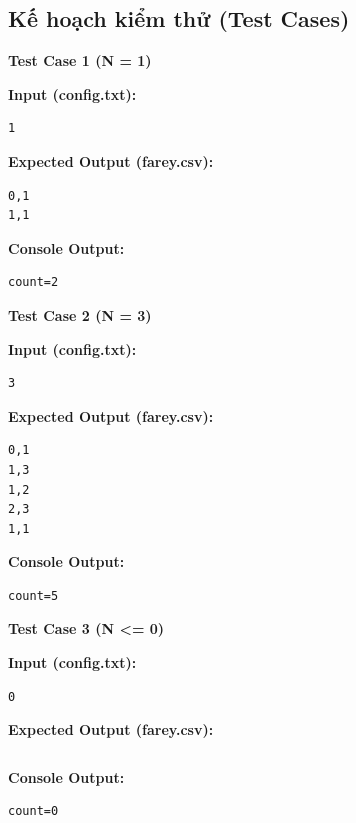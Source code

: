 \subsection{Kế hoạch kiểm thử (Test Cases)}

\textbf{Test Case 1 (N = 1)}

\textbf{Input (config.txt):}
\begin{lstlisting}
1
\end{lstlisting}

\textbf{Expected Output (farey.csv):}
\begin{lstlisting}
0,1
1,1
\end{lstlisting}

\textbf{Console Output:}
\begin{lstlisting}
count=2
\end{lstlisting}

\vspace{0.5cm}

\textbf{Test Case 2 (N = 3)}

\textbf{Input (config.txt):}
\begin{lstlisting}
3
\end{lstlisting}

\textbf{Expected Output (farey.csv):}
\begin{lstlisting}
0,1
1,3
1,2
2,3
1,1
\end{lstlisting}

\textbf{Console Output:}
\begin{lstlisting}
count=5
\end{lstlisting}

\vspace{0.5cm}

\textbf{Test Case 3 (N <= 0)}

\textbf{Input (config.txt):}
\begin{lstlisting}
0
\end{lstlisting}

\textbf{Expected Output (farey.csv):}
\begin{lstlisting}

\end{lstlisting}

\textbf{Console Output:}
\begin{lstlisting}
count=0
\end{lstlisting}